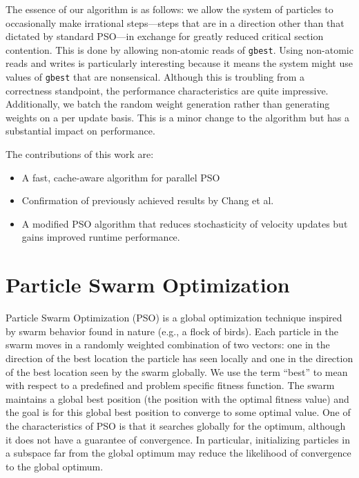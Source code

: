 The essence of our algorithm is as follows: we allow the system of particles to occasionally
make irrational steps---steps that are in a direction other than that dictated by
standard PSO---in exchange for greatly reduced critical section contention.
This is done by 
allowing non-atomic reads of \texttt{gbest}. Using non-atomic reads and writes
is particularly interesting because it means the system might use values of
\texttt{gbest} that are nonsensical. Although this is troubling from a
correctness standpoint, the performance characteristics are quite
impressive. Additionally, we batch the random weight generation rather than
generating weights on a per update basis. This is a minor change to the
algorithm but has a substantial impact on performance.

The contributions of this work are:
\begin{itemize}
\item A fast, cache-aware algorithm for parallel PSO
\item Confirmation of previously achieved results by Chang et
  al. \cite{cache-pso}
\item A modified PSO algorithm that reduces stochasticity of velocity updates
  but gains improved runtime performance.  
\end{itemize}



\section{Particle Swarm Optimization}\label{sec:pso}
Particle Swarm Optimization (PSO) \cite{pso} is a global optimization technique
inspired by swarm behavior found in nature (e.g., a flock of birds).
Each particle in the swarm moves in a randomly weighted
combination of two vectors: one in the direction of the best location the
particle has seen locally and one in the direction of the best location seen by
the swarm globally. We use the term ``best'' to mean with respect to a predefined and
problem specific fitness function.
The swarm maintains a global best position (the position
with the optimal fitness value) and the goal is for this global best position to
converge to some optimal value.
One of the characteristics of PSO is that it searches globally for the optimum,
although it does not have a guarantee of convergence.
In particular, initializing particles in a subspace far from the
global optimum may reduce the likelihood of convergence to the global optimum.

